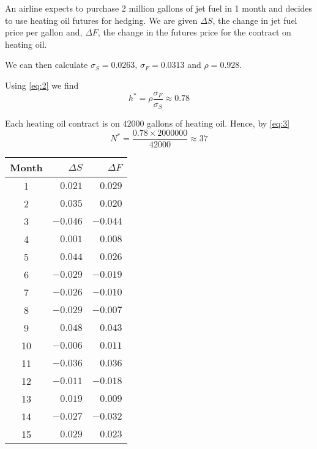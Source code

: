 \begin{eg}
    \begin{minipage}[t][][t]{0.55\textwidth}
        An airline expects to purchase 2 million gallons of jet fuel in 1 month and decides to use heating oil futures for hedging. We are given \(\Delta S\), the change in jet fuel price per gallon and, \(\Delta F\), the change in the futures price for the contract on heating oil.
        \medskip

        We can then calculate \(\sigma_{S}=0.0263\), \(\sigma_{F}=0.0313\) and \(\rho=0.928\).
        \medskip

        Using \eqref{eq:2} we find
        \begin{equation*}
            h^{*}=\rho\frac{\sigma_{F}}{\sigma_{S}}\approx 0.78
        \end{equation*}

        Each heating oil contract is on \(\num{42000}\) gallons of heating oil. Hence, by \eqref{eq:3}
        \begin{equation*}
            N^{*} = \frac{0.78\times \num{2000000}}{\num{ 42000}}\approx 37
        \end{equation*}
    \end{minipage}
    \begin{minipage}[t][][c]{0.34\textwidth}
        \raggedleft
        \vspace{-0.2cm}
        \begin{tabular}{|c|r|r|}
                \hline
                Month & \(\Delta S\) & \(\Delta F\)\\
                \hline
                1 & \(0.021\) & \(0.029\)\\
                2 & \(0.035\) & \(0.020\)\\
                3 & \(-0.046\) & \(-0.044\)\\
                4 & \(0.001\) & \(0.008\)\\
                5 & \(0.044\) & \(0.026\)\\
                6 & \(-0.029\) & \(-0.019\)\\
                7 & \(-0.026\) & \(-0.010\)\\
                8 & \(-0.029\) & \(-0.007\)\\
                9 & \(0.048\) & \(0.043\)\\
                10 & \(-0.006\) & \(0.011\)\\
                11 & \(-0.036\) & \(0.036\)\\
                12 & \(-0.011\) & \(-0.018\)\\
                13 & \(0.019\) & \(0.009\)\\
                14 & \(-0.027\) & \(-0.032\)\\
                15 & \(0.029\) & \(0.023\)\\
                \hline
        \end{tabular}
    \end{minipage}
\end{eg}

